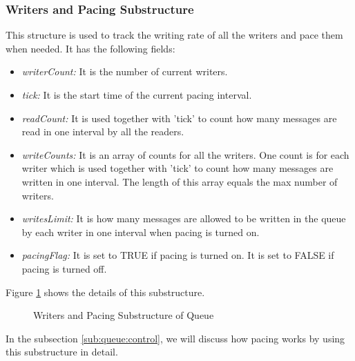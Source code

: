 \subsubsection{\label{sub:queue:struct:writers}{Writers and Pacing Substructure}}
This structure is used to track the writing rate of all the writers and pace them when needed. It has the following fields:
 \begin{itemize}	
 	\item{\emph{writerCount:} It is the number of current writers.}
	  \item{\emph{tick:} It is the start time of the current pacing interval.}
	  	\item{\emph{readCount:} It is used together with 'tick' to count how many messages are read in one interval by all the readers. }
	\item{\emph{writeCounts:} It is an array of counts for all the writers. One count is for each writer which is used together with 'tick' to count how many messages are written in one interval. The length of this array equals the max number of writers.}
	\item{\emph{writesLimit:} It is how many messages are allowed to be written in the queue by each writer in one interval when pacing is turned on. }
	\item{\emph{pacingFlag:} It is set to TRUE if pacing is turned on. It is set to FALSE if pacing is turned off.} 
\end{itemize} 
Figure \ref{fig:queue:struct:writers} shows the details of this substructure.
\begin{figure}
\centering
{}
\caption{ Writers and Pacing Substructure of Queue}
\label{fig:queue:struct:writers}
\end{figure}
In the subsection \ref{sub:queue:control}, we will discuss how pacing works by using this substructure in detail.
 
